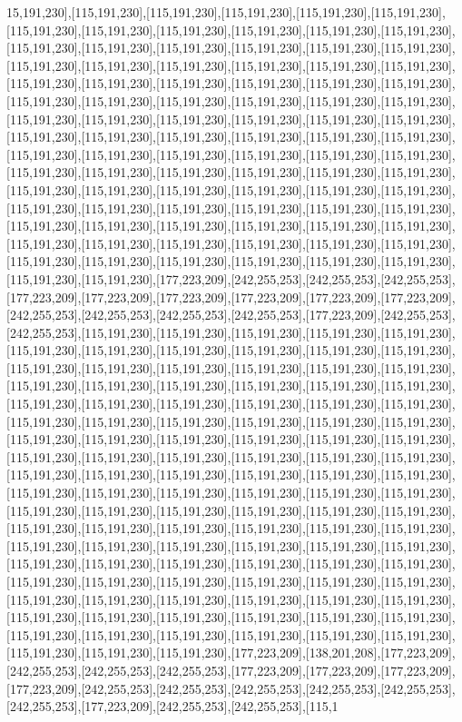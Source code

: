 15,191,230],[115,191,230],[115,191,230],[115,191,230],[115,191,230],[115,191,230],[115,191,230],[115,191,230],[115,191,230],[115,191,230],[115,191,230],[115,191,230],[115,191,230],[115,191,230],[115,191,230],[115,191,230],[115,191,230],[115,191,230],[115,191,230],[115,191,230],[115,191,230],[115,191,230],[115,191,230],[115,191,230],[115,191,230],[115,191,230],[115,191,230],[115,191,230],[115,191,230],[115,191,230],[115,191,230],[115,191,230],[115,191,230],[115,191,230],[115,191,230],[115,191,230],[115,191,230],[115,191,230],[115,191,230],[115,191,230],[115,191,230],[115,191,230],[115,191,230],[115,191,230],[115,191,230],[115,191,230],[115,191,230],[115,191,230],[115,191,230],[115,191,230],[115,191,230],[115,191,230],[115,191,230],[115,191,230],[115,191,230],[115,191,230],[115,191,230],[115,191,230],[115,191,230],[115,191,230],[115,191,230],[115,191,230],[115,191,230],[115,191,230],[115,191,230],[115,191,230],[115,191,230],[115,191,230],[115,191,230],[115,191,230],[115,191,230],[115,191,230],[115,191,230],[115,191,230],[115,191,230],[115,191,230],[115,191,230],[115,191,230],[115,191,230],[115,191,230],[115,191,230],[115,191,230],[115,191,230],[115,191,230],[115,191,230],[115,191,230],[115,191,230],[115,191,230],[115,191,230],[115,191,230],[115,191,230],[115,191,230],[177,223,209],[242,255,253],[242,255,253],[242,255,253],[177,223,209],[177,223,209],[177,223,209],[177,223,209],[177,223,209],[177,223,209],[242,255,253],[242,255,253],[242,255,253],[242,255,253],[177,223,209],[242,255,253],[242,255,253],[115,191,230],[115,191,230],[115,191,230],[115,191,230],[115,191,230],[115,191,230],[115,191,230],[115,191,230],[115,191,230],[115,191,230],[115,191,230],[115,191,230],[115,191,230],[115,191,230],[115,191,230],[115,191,230],[115,191,230],[115,191,230],[115,191,230],[115,191,230],[115,191,230],[115,191,230],[115,191,230],[115,191,230],[115,191,230],[115,191,230],[115,191,230],[115,191,230],[115,191,230],[115,191,230],[115,191,230],[115,191,230],[115,191,230],[115,191,230],[115,191,230],[115,191,230],[115,191,230],[115,191,230],[115,191,230],[115,191,230],[115,191,230],[115,191,230],[115,191,230],[115,191,230],[115,191,230],[115,191,230],[115,191,230],[115,191,230],[115,191,230],[115,191,230],[115,191,230],[115,191,230],[115,191,230],[115,191,230],[115,191,230],[115,191,230],[115,191,230],[115,191,230],[115,191,230],[115,191,230],[115,191,230],[115,191,230],[115,191,230],[115,191,230],[115,191,230],[115,191,230],[115,191,230],[115,191,230],[115,191,230],[115,191,230],[115,191,230],[115,191,230],[115,191,230],[115,191,230],[115,191,230],[115,191,230],[115,191,230],[115,191,230],[115,191,230],[115,191,230],[115,191,230],[115,191,230],[115,191,230],[115,191,230],[115,191,230],[115,191,230],[115,191,230],[115,191,230],[115,191,230],[115,191,230],[115,191,230],[115,191,230],[115,191,230],[115,191,230],[115,191,230],[115,191,230],[115,191,230],[115,191,230],[115,191,230],[115,191,230],[115,191,230],[115,191,230],[115,191,230],[115,191,230],[115,191,230],[115,191,230],[115,191,230],[115,191,230],[115,191,230],[115,191,230],[177,223,209],[138,201,208],[177,223,209],[242,255,253],[242,255,253],[242,255,253],[177,223,209],[177,223,209],[177,223,209],[177,223,209],[242,255,253],[242,255,253],[242,255,253],[242,255,253],[242,255,253],[242,255,253],[177,223,209],[242,255,253],[242,255,253],[115,1